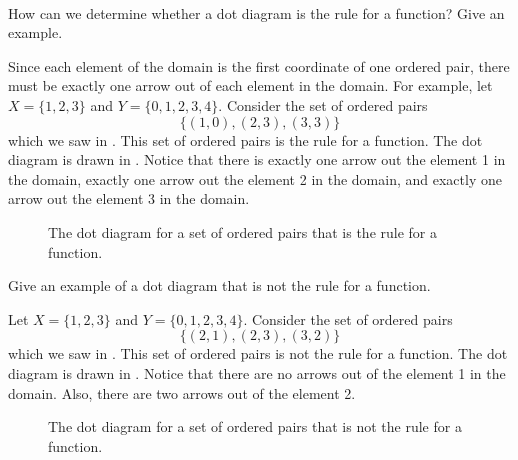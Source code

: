 \begin{exam}
\label{exam_when_graph_is_fn}
~
    \begin{apart}
        \item How can we determine whether a dot diagram is the rule for a function? Give an example.
            \begin{soln}
                Since each element of the domain is the first coordinate of one ordered pair, there must be exactly one arrow out of each element in the domain. For example, let $X = \{1,2,3\}$ and $Y = \{0,1,2,3,4\}$.  Consider the set of ordered pairs $$\{(1,0), (2,3), (3,3)\}$$ which we saw in . This set of ordered pairs is the rule for a function. The dot diagram is drawn in . Notice that there is exactly one arrow out the element 1 in the domain, exactly one arrow out the element 2 in the domain, and exactly one arrow out the element 3 in the domain.
            \end{soln}
            
            \begin{figure}[hbtp]
                \centering
                
                \caption{The dot diagram for a set of ordered pairs that is the rule for a function.}
                \label{fig_finite_is_function}
            \end{figure}
        \item Give an example of a dot diagram that is not the rule for a function.
            \begin{soln}
                Let $X = \{1,2,3\}$ and $Y = \{0,1,2,3,4\}$.  Consider the set of ordered pairs $$\{(2,1), (2,3), (3,2)\}$$ which we saw in . This set of ordered pairs is not the rule for a function.  The dot diagram is drawn in . Notice that there are no arrows out of the element 1 in the domain.  Also, there are two arrows out of the element 2.
            \end{soln}

            \begin{figure}[hbtp]
                \centering
                
                \caption{The dot diagram for a set of ordered pairs that is not the rule for a function.}
                \label{fig_finite_not_function}
            \end{figure}


\end{apart}
\end{exam}
